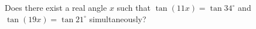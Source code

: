 Does there exist a real angle $x$ such that $\tan(11x)=\tan34^\circ$ and $\tan(19x)=\tan21^\circ$ simultaneously?
